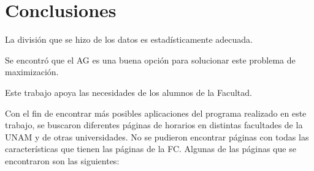 \chapter{Conclusiones}

La división que se hizo de los datos es estadísticamente  adecuada.

Se encontró que el AG es una buena opción para solucionar este problema de maximización.

Este trabajo apoya las necesidades de los alumnos de la Facultad.

Con el fin de encontrar más posibles aplicaciones del programa realizado en este trabajo, se buscaron diferentes páginas de horarios en distintas facultades de la UNAM y de otras universidades. No se pudieron encontrar páginas con todas las características que tienen las páginas de la FC. Algunas de las páginas que se encontraron son las siguientes:

